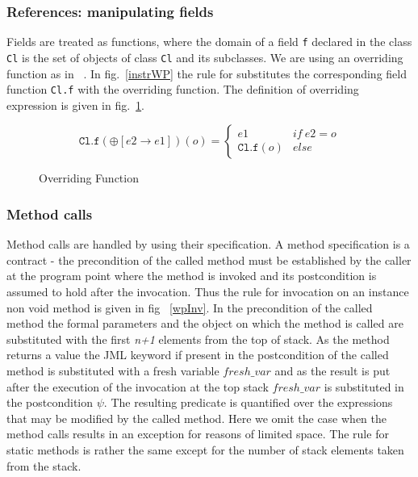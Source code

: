 \subsubsection{References: manipulating fields}
Fields are treated as functions, where the domain of a field \texttt{f} 
declared in the class \texttt{Cl} is the set of objects of class \texttt{Cl} and its subclasses.
We are using an overriding function as in ~\cite{B00ppp}. 
In fig.~\ref{instrWP} the rule for  substitutes the corresponding field function \texttt{Cl.f} with the overriding function. 
The definition of overriding expression is given in fig.~\ref{override}.

\begin{figure}
$$
 \texttt{Cl.f}(\oplus[e2 \rightarrow e1])(o) = \left\{ \begin{array} {ll}
						       e1 & if \ e2 = o \\
					               \texttt{Cl.f}(o)	& else 
	\end{array}\right. 
$$ 
\caption{Overriding Function}
\label{override}
\end{figure}



\subsubsection{Method calls}
Method calls are handled by using their specification. A method specification is a contract - the precondition of the called method
must be established by the caller at the program point where the method is invoked and its postcondition is assumed to hold after the invocation. Thus the rule for
invocation on an instance non void method is given in fig ~\ref{wpInv}. In the precondition of the called method the formal parameters and the object on which the method is called are substituted with the first \textit{n+1} elements from the top of stack. As the method returns a value the JML keyword 
 if present in the postcondition of the called method is substituted with a fresh variable $fresh\_var$ and as the result is put after the execution of the invocation at the top stack $fresh\_var$ is substituted in the postcondition $\psi$. The resulting predicate is quantified over the 
expressions that may be modified by the called method. Here we omit the case when the method calls results in an exception for reasons of limited space. 
The rule for static methods is rather the same except for the number of stack elements taken from the stack.  

